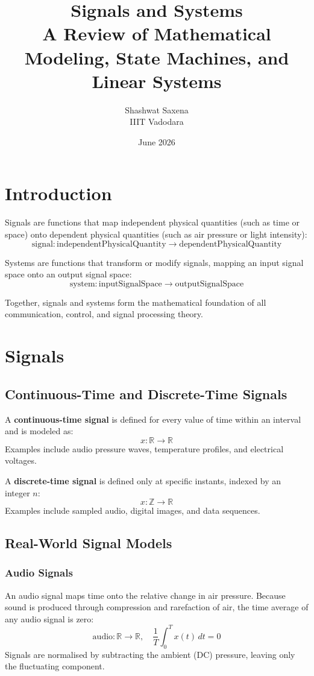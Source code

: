 \documentclass[11pt]{article}
\title{\textbf{Signals and Systems}\\
\large A Review of Mathematical Modeling, State Machines, and Linear Systems}
\author{Shashwat Saxena\\IIIT Vadodara}
\date{June 2026}
\begin{document}
\maketitle
\tableofcontents
\newpage

 
\section{Introduction}

Signals are functions that map independent physical quantities (such as time or space) onto dependent physical quantities (such as air pressure or light intensity):
\[
  \text{signal}: \text{independentPhysicalQuantity} \rightarrow \text{dependentPhysicalQuantity}
\]

Systems are functions that transform or modify signals, mapping an input signal space onto an output signal space:
\[
  \text{system}: \text{inputSignalSpace} \rightarrow \text{outputSignalSpace}
\]

Together, signals and systems form the mathematical foundation of all communication, control, and signal processing theory.

 
\section{Signals}

\subsection{Continuous-Time and Discrete-Time Signals}

A \textbf{continuous-time signal} is defined for every value of time within an interval and is modeled as:
\[
  x : \mathbb{R} \rightarrow \mathbb{R}
\]
Examples include audio pressure waves, temperature profiles, and electrical voltages.

A \textbf{discrete-time signal} is defined only at specific instants, indexed by an integer $n$:
\[
  x : \mathbb{Z} \rightarrow \mathbb{R}
\]
Examples include sampled audio, digital images, and data sequences.

\subsection{Real-World Signal Models}

\subsubsection{Audio Signals}
An audio signal maps time onto the relative change in air pressure. Because sound is produced through compression and rarefaction of air, the time average of any audio signal is zero:
\[
  \text{audio} : \mathbb{R} \rightarrow \mathbb{R}, \quad \frac{1}{T}\int_0^T x(t)\,dt = 0
\]
Signals are normalised by subtracting the ambient (DC) pressure, leaving only the fluctuating component.
\end{document}
